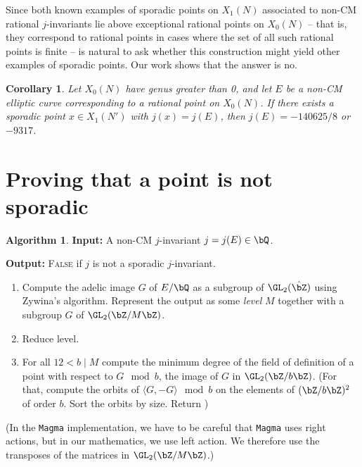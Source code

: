 \documentclass[11pt,reqno]{amsart}
\theoremstyle{plain}
\newtheorem{corollary}[theorem]{Corollary}
\theoremstyle{definition}
\newtheorem{algorithm}[theorem]{Algorithm}
\newcommand{\Q}{\bQ}
\newcommand{\Z}{\bZ}
\newcommand{\filip}[1]{{\color{cyan} \textsf{$\sun\sun\sun$ Filip: [#1]}}}
\begin{document}
Since both known examples of sporadic points on $X_1(N)$ associated to non-CM rational $j$-invariants lie above exceptional rational points on $X_0(N)$ -- that is, they correspond to rational points in cases where the set of all such rational points is finite -- is natural to ask whether this construction might yield other examples of sporadic points. Our work shows that the answer is no.
\begin{corollary}
Let $X_0(N)$ have genus greater than 0, and let $E$ be a non-CM elliptic curve corresponding to a rational point on $X_0(N)$. If there exists a sporadic point $x \in X_1(N')$ with $j(x)=j(E)$, then $j(E) =-140625/8$ or $-9317$.
\end{corollary}

\section{Proving that a point is not sporadic}

\begin{algorithm}
\textbf{Input:} A non-CM $j$-invariant $j = j(E) \in \Q$.

\textbf{Output:} \textsc{False} if $j$ is not a sporadic $j$-invariant.

\begin{enumerate}
    \item Compute the adelic image $G$ of $E/\Q$ as a subgroup of $\GL_2(\hat{\Z})$ using Zywina's algorithm. Represent the output as some \emph{level} $M$ together with a subgroup $G$ of $\GL_2(\Z/M\Z)$.

    \item Reduce level.

    \item For all $12 < b \mid M$ compute the minimum degree of the field of definition of a point with respect to $G \mod b$, the image of $G$ in $\GL_2(\Z/b\Z)$. (For that, compute the orbits of $\langle G, -G \rangle \mod b$ on the elements of $(\Z/b\Z)^2$ of order $b$. Sort the orbits by size. Return ) 
\end{enumerate}
\end{algorithm}

(In the \texttt{Magma} implementation, we have to be careful that \texttt{Magma} uses right actions, but in our mathematics, we use left action. We therefore use the transposes of the matrices in $\GL_2(\Z/M\Z)$.)


\vspace{20 mm}


\end{document}
